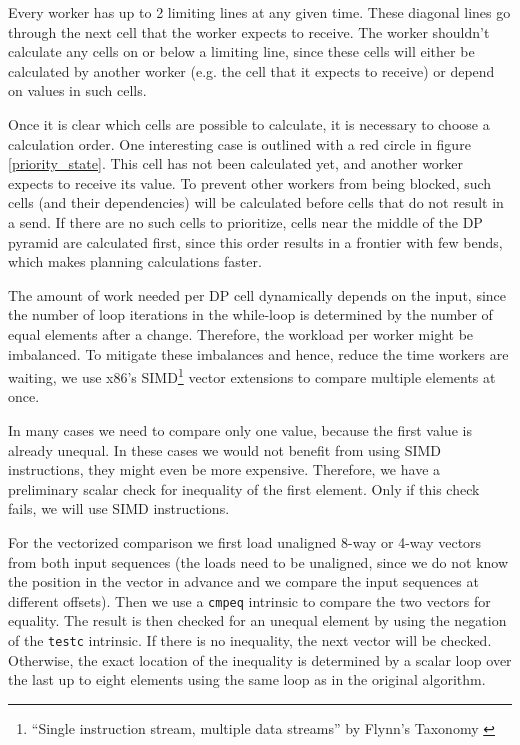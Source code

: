 Every worker has up to 2 limiting lines at any given time. These diagonal lines go through the next cell that the worker expects to receive. The worker shouldn't calculate any cells on or below a limiting line, since these cells will either be calculated by another worker (e.g. the cell that it expects to receive) or depend on values in such cells.

Once it is clear which cells are possible to calculate, it is necessary to choose a calculation order. One interesting case is outlined with a red circle in figure \ref{priority_state}. This cell has not been calculated yet, and another worker expects to receive its value. To prevent other workers from being blocked, such cells (and their dependencies) will be calculated before cells that do not result in a send. If there are no such cells to prioritize, cells near the middle of the DP pyramid are calculated first, since this order results in a frontier with few bends, which makes planning calculations faster.

The amount of work needed per DP cell dynamically depends on the input, since the number of loop iterations in the while-loop is determined by the number of equal elements after a change. Therefore, the workload per worker might be imbalanced. %
To mitigate these imbalances and hence, reduce the time workers are waiting, we use x86's SIMD\footnote{``Single instruction stream, multiple data streams'' by Flynn's Taxonomy \cite{flynns_taxonomy}} vector extensions to compare multiple elements at once.

In many cases we need to compare only one value, because the first value is already unequal. In these cases we would not benefit from using SIMD instructions, they might even be more expensive. Therefore, we have a preliminary scalar check for inequality of the first element. Only if this check fails, we will use SIMD instructions.


For the vectorized comparison we first load unaligned 8-way or 4-way vectors from both input sequences (the loads need to be unaligned, since we do not know the position in the vector in advance and we compare the input sequences at different offsets). Then we use a \texttt{cmpeq} intrinsic to compare the two vectors for equality. The result is then checked for an unequal element by using the negation of the \texttt{testc} intrinsic. If there is no inequality, the next vector will be checked. Otherwise, the exact location of the inequality is determined by a scalar loop over the last up to eight elements using the same loop as in the original algorithm.